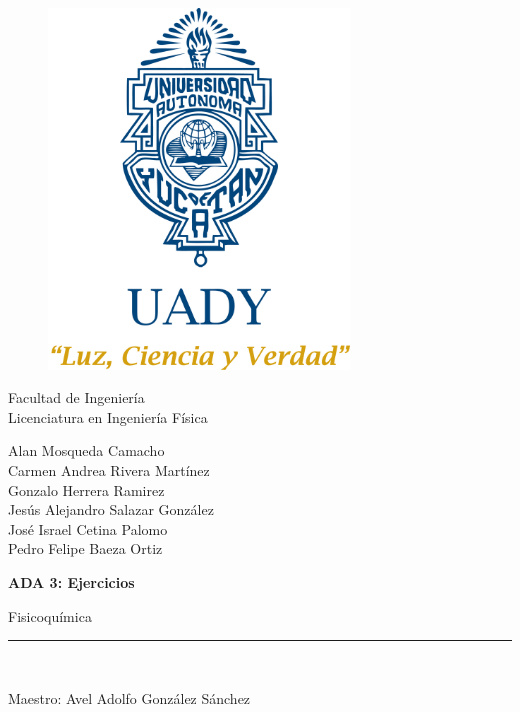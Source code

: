 \documentclass[12pt]{article}
\begin{document}
	\begin{titlepage}
		
		\begin{center}
			\vspace*{-1in}
			\begin{figure}[htb]
				\begin{center}
					\includegraphics[width=8cm]{logo}
				\end{center}
			\end{figure}
			
			Facultad de Ingeniería\\
			\vspace*{0.15in}
			Licenciatura en Ingeniería Física \\
			\vspace*{0.2in}
			\begin{large}
				Alan Mosqueda Camacho\\
				Carmen Andrea Rivera Martínez\\
				Gonzalo Herrera Ramirez\\
				Jesús Alejandro Salazar González\\
				José Israel Cetina Palomo\\
				Pedro Felipe Baeza Ortiz\\
			\end{large}
			\vspace*{0.2in}
			\begin{Large}
				\textbf{ADA 3: Ejercicios} \\
			\end{Large}
			\vspace*{0.2in}
			\begin{large}
				Fisicoquímica \\
			\end{large}
			\vspace*{0.3in}
			\rule{80mm}{0.1mm}\\
			\vspace*{0.1in}
			\begin{large}
				Maestro: Avel Adolfo González Sánchez\\
			\end{large}
		\end{center}
		
	\end{titlepage}
\end{document}
